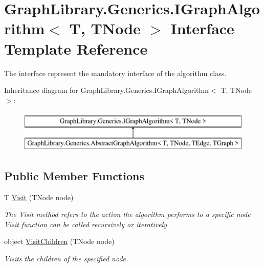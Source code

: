 \hypertarget{interface_graph_library_1_1_generics_1_1_i_graph_algorithm}{}\section{Graph\+Library.\+Generics.\+I\+Graph\+Algorithm$<$ T, T\+Node $>$ Interface Template Reference}
\label{interface_graph_library_1_1_generics_1_1_i_graph_algorithm}


The interface represent the mandatory interface of the algorithm class.  


Inheritance diagram for Graph\+Library.\+Generics.\+I\+Graph\+Algorithm$<$ T, T\+Node $>$\+:\begin{figure}[H]
\begin{center}
\leavevmode
\includegraphics[height=2.000000cm]{interface_graph_library_1_1_generics_1_1_i_graph_algorithm}
\end{center}
\end{figure}
\subsection*{Public Member Functions}
\begin{DoxyCompactItemize}
\item 
T \hyperlink{interface_graph_library_1_1_generics_1_1_i_graph_algorithm_a8bc65da7e1004a5c55f75b57872fad31}{Visit} (T\+Node node)
\begin{DoxyCompactList}\small\item\em The Visit method refers to the action the algorithm performs to a specific node Visit function can be called recursively or iteratively. \end{DoxyCompactList}\item 
object \hyperlink{interface_graph_library_1_1_generics_1_1_i_graph_algorithm_aa8576b6860d0047bfd491c3101e876cc}{Visit\+Children} (T\+Node node)
\begin{DoxyCompactList}\small\item\em Visits the children of the specified node. \end{DoxyCompactList}\end{DoxyCompactItemize}


